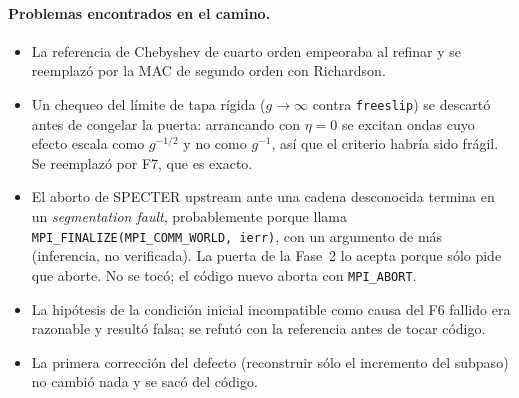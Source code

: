 \paragraph{Problemas encontrados en el camino.}
\begin{itemize}
\item La referencia de Chebyshev de cuarto orden empeoraba al refinar y se reemplazó por la
  MAC de segundo orden con Richardson.
\item Un chequeo del límite de tapa rígida ($g\to\infty$ contra \texttt{freeslip}) se
  descartó antes de congelar la puerta: arrancando con $\eta=0$ se excitan ondas cuyo efecto
  escala como $g^{-1/2}$ y no como $g^{-1}$, así que el criterio habría sido frágil. Se
  reemplazó por F7, que es exacto.
\item El aborto de SPECTER upstream ante una cadena desconocida termina en un
  \emph{segmentation fault}, probablemente porque llama
  \texttt{MPI\_FINALIZE(MPI\_COMM\_WORLD, ierr)}, con un argumento de más (inferencia, no
  verificada). La puerta de la Fase~2 lo acepta porque sólo pide que aborte. No se tocó; el
  código nuevo aborta con \texttt{MPI\_ABORT}.
\item La hipótesis de la condición inicial incompatible como causa del F6 fallido era
  razonable y resultó falsa; se refutó con la referencia antes de tocar código.
\item La primera corrección del defecto (reconstruir sólo el incremento del subpaso) no
  cambió nada y se sacó del código.
\end{itemize}
